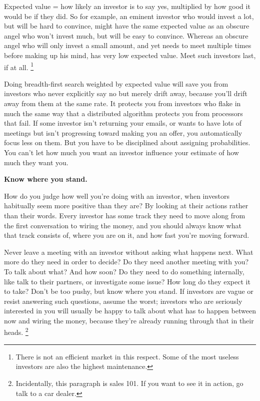 Expected value = how likely an investor is to say yes, multiplied by how
good it would be if they did. So for example, an eminent investor who
would invest a lot, but will be hard to convince, might have the same
expected value as an obscure angel who won't invest much, but will be
easy to convince. Whereas an obscure angel who will only invest a small
amount, and yet needs to meet multiple times before making up his mind,
has very low expected value. Meet such investors last, if at all.
\footnote{There is not an efficient market in this respect. Some of the
most useless investors are also the highest maintenance.}

Doing breadth-first search weighted by expected value will save you from
investors who never explicitly say no but merely drift away, because
you'll drift away from them at the same rate. It protects you from
investors who flake in much the same way that a distributed algorithm
protects you from processors that fail. If some investor isn't returning
your emails, or wants to have lots of meetings but isn't progressing
toward making you an offer, you automatically focus less on them. But
you have to be disciplined about assigning probabilities. You can't let
how much you want an investor influence your estimate of how much they
want you.

\textbf{Know where you stand.}

How do you judge how well you're doing with an investor, when investors
habitually seem more positive than they are? By looking at their actions
rather than their words. Every investor has some track they need to move
along from the first conversation to wiring the money, and you should
always know what that track consists of, where you are on it, and how
fast you're moving forward.

Never leave a meeting with an investor without asking what happens next.
What more do they need in order to decide? Do they need another meeting
with you? To talk about what? And how soon? Do they need to do something
internally, like talk to their partners, or investigate some issue? How
long do they expect it to take? Don't be too pushy, but know where you
stand. If investors are vague or resist answering such questions, assume
the worst; investors who are seriously interested in you will usually be
happy to talk about what has to happen between now and wiring the money,
because they're already running through that in their heads.
\footnote{Incidentally, this paragraph is sales 101. If you want to see
it in action, go talk to a car dealer.}

